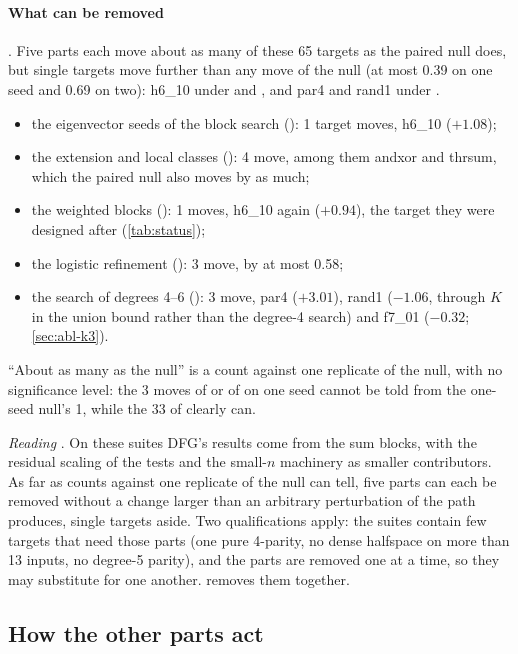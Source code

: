\paragraph{What can be removed} . Five parts each move about as many of these 65 targets as the paired null does, but single targets move further than any move of the null (at most 0.39 on one seed and 0.69 on two): h6\_10 under  and , and par4 and rand1 under .
\begin{itemize}
\item the eigenvector seeds of the block search (): 1 target moves, h6\_10 ($+1.08$);
\item the extension and local classes (): 4 move, among them andxor and thrsum, which the paired null also moves by as much;
\item the weighted blocks (): 1 moves, h6\_10 again ($+0.94$), the target they were designed after (\cref{tab:status});
\item the logistic refinement (): 3 move, by at most 0.58;
\item the search of degrees 4--6 (): 3 move, par4 ($+3.01$), rand1 ($-1.06$, through $K$ in the union bound rather than the degree-4 search) and f7\_01 ($-0.32$; \cref{sec:abl-k3}).
\end{itemize}
``About as many as the null'' is a count against one replicate of the null, with no significance level: the 3 moves of  or of  on one seed cannot be told from the one-seed null's 1, while the 33 of  clearly can.

\emph{Reading} . On these suites DFG's results come from the sum blocks, with the residual scaling of the tests and the small-$n$ machinery as smaller contributors. As far as counts against one replicate of the null can tell, five parts can each be removed without a change larger than an arbitrary perturbation of the path produces, single targets aside. Two qualifications apply: the suites contain few targets that need those parts (one pure 4-parity, no dense halfspace on more than 13 inputs, no degree-5 parity), and the parts are removed one at a time, so they may substitute for one another.  removes them together.

\subsection{How the other parts act}\label{sec:abl-how}

